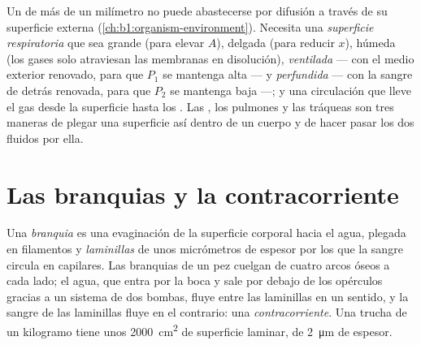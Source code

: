 \begin{proposition}\label{prop:b1:gas-exchange:requirements}
Un  de más de un milímetro no puede abastecerse por difusión a
través de su superficie externa (\cref{ch:b1:organism-environment}).
Necesita una \emph{superficie respiratoria} que sea grande (para elevar
$A$), delgada (para reducir $x$), húmeda (los gases solo atraviesan las
membranas en disolución), \emph{ventilada} --- con el medio exterior
renovado, para que $P_1$ se mantenga alta --- y \emph{perfundida} --- con la
sangre de detrás renovada, para que $P_2$ se mantenga baja ---; y una
circulación que lleve el gas desde la superficie hasta los . Las
, los pulmones y las tráqueas son tres maneras de plegar una
superficie así dentro de un cuerpo y de hacer pasar los dos fluidos por
ella.
\end{proposition}

\section{Las branquias y la contracorriente}

\begin{definition}[Branquia]\label{def:b1:gas-exchange:gill}
Una \emph{branquia} es una evaginación de la superficie corporal hacia el
agua, plegada en filamentos y \emph{laminillas} de unos micrómetros de
espesor por los que la sangre circula en capilares. Las branquias de un pez
cuelgan de cuatro arcos óseos a cada lado; el agua, que entra por la boca y
sale por debajo de los opérculos gracias a un sistema de dos bombas, fluye
entre las laminillas en un sentido, y la sangre de las laminillas fluye en
el contrario: una \emph{contracorriente}. Una trucha de un kilogramo tiene unos \qty{2000}{cm^2} de
superficie laminar, de \qty{2}{\micro m} de espesor.
\end{definition}

